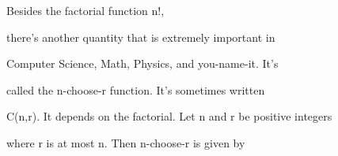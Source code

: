 Besides the factorial function n!,

there's another quantity that is extremely important in

Computer Science, Math, Physics, and you-name-it. It's

called the n-choose-r function. It's sometimes written

C(n,r). It depends on the factorial. Let n and r be positive integers

where r is at most n. Then n-choose-r is given by

